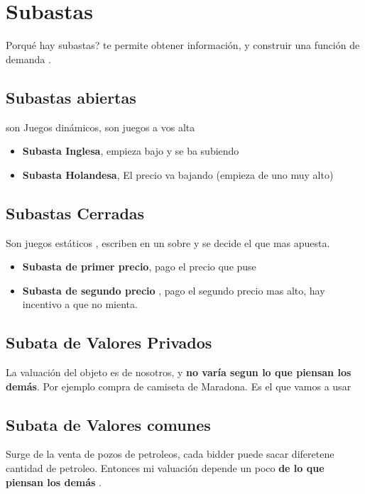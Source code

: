 
\section{Subastas}

Porqué hay subastas? te permite obtener información, y construir una  {\color{red} función de demanda} .




\subsection{ Subastas abiertas } 
son  {\color{red} Juegos dinámicos}, son juegos  a vos alta
\begin{itemize}
	\item \textbf{Subasta Inglesa}, empieza bajo y se ba subiendo
		\item  \textbf{Subasta Holandesa}, El precio va bajando (empieza de uno muy alto)
\end{itemize}

\subsection{ Subastas Cerradas } 
Son {\color{red} juegos estáticos} , escriben en un sobre y se decide el que mas apuesta.
\begin{itemize}
	\item  \textbf{Subasta de primer precio}, pago el precio que puse
	\item \textbf{Subasta de segundo precio} , pago el segundo precio mas alto, hay incentivo a que no mienta.
\end{itemize}

\subsection{  Subata de Valores Privados } 
La valuación del objeto es de nosotros, y \textbf{no varía segun lo que piensan los demás}. 
Por ejemplo compra de camiseta de Maradona.  Es el que {\color{red} vamos a usar }


\subsection{  Subata de Valores comunes } 
Surge de la venta de pozos de petroleos,  cada bidder puede sacar diferetene cantidad de petroleo. Entonces
mi valuación depende un poco \textbf{de lo que piensan los demás} .


